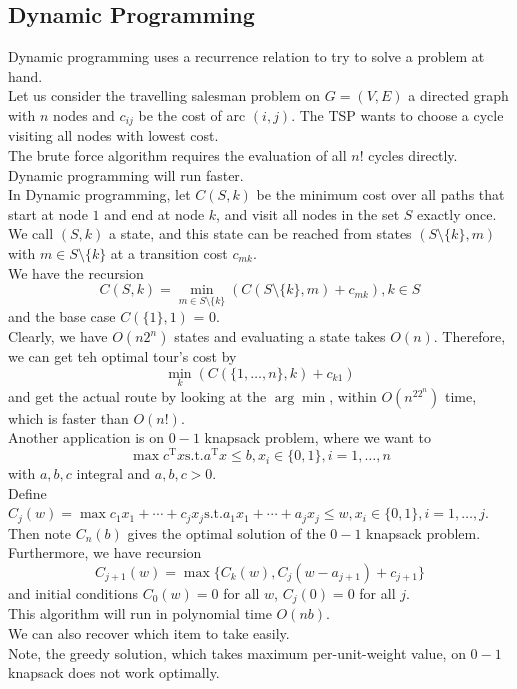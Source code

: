 \documentclass[12pt]{article}
\newcommand{\st}{\mathrm{s.t.}}
\newcommand{\T}{\mathrm{T}}
\theoremstyle{definition}
\begin{document}
\subsection{Dynamic Programming}
Dynamic programming uses a recurrence relation to try to solve a problem at hand.\\
Let us consider the travelling salesman problem on $G=(V,E)$ a directed graph with $n$ nodes and $c_{ij}$ be the cost of arc $(i,j)$. The TSP wants to choose a cycle visiting all nodes with lowest cost.\\
The brute force algorithm requires the evaluation of all $n!$ cycles directly. Dynamic programming will run faster.\\
In Dynamic programming, let $C(S,k)$ be the minimum cost over all paths that start at node $1$ and end at node $k$, and visit all nodes in the set $S$ exactly once. We call $(S,k)$ a state, and this state can be reached from states $(S\setminus\{k\},m)$ with $m\in S\setminus\{k\}$ at a transition cost $c_{mk}$.\\
We have the recursion
\[
C(S,k)=\min_{m\in S\setminus\{k\}} (C(S\setminus\{k\}, m)+c_{mk}), k\in S
\]
and the base case $C(\{1\},1)$ = 0.\\
Clearly, we have $O(n2^n)$ states and evaluating a state takes $O(n)$. Therefore, we can get teh optimal tour's cost by
\[
\min_k (C(\{1,\ldots, n\},k)+c_{k1})
\]
and get the actual route by looking at the $\arg\min$, within $O(n^22^n)$ time, which is faster than $O(n!)$.\\
Another application is on $0-1$ knapsack problem, where we want to 
\[
\max c^\T x \st a^\T x\leq b, x_i\in\{0,1\}, i=1,\ldots, n
\]
with $a,b,c$ integral and $a,b,c>0$.\\
Define $C_j(w)=\max c_1x_1+\cdots+c_jx_j \st a_1x_1+\cdots+a_jx_j\leq w, x_i\in\{0,1\}, i=1,\ldots, j$. Then note $C_n(b)$ gives the optimal solution of the $0-1$ knapsack problem. Furthermore, we have recursion
\[
C_{j+1}(w)=\max\{C_k(w), C_j(w-a_{j+1})+c_{j+1}\}
\]
and initial conditions $C_0(w)=0$ for all $w$, $C_j(0)=0$ for all $j$.\\
This algorithm will run in polynomial time $O(nb)$.\\
We can also recover which item to take easily.\\
Note, the greedy solution, which takes maximum per-unit-weight value, on $0-1$ knapsack does not work optimally.
\end{document}
